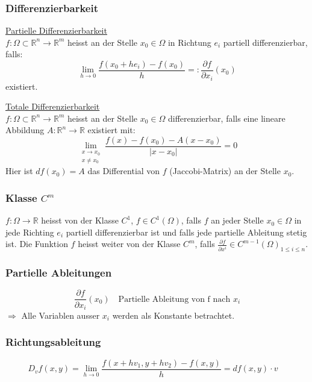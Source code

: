 \documentclass[6pt]{article}
\begin{document}
\begin{multicols*}{3}
	
	\subsubsection*{Differenzierbarkeit}
	
	\underline{Partielle Differenzierbarkeit} \\
	$f: \Omega \subset \mathbb{R}^n \to \mathbb{R}^m$ heisst an der Stelle $x_0 \in \Omega$ in Richtung $e_i$ partiell differenzierbar, falls:
	\[
			\lim_{h \to 0} \frac{f(x_0 + he_i)-f(x_0)}{h} =: \frac{\partial f}{\partial x_i} (x_0)
	\]
	existiert.
	\vspace{4mm}
		
	
	\underline{Totale Differenzierbarkeit} \\
	 $f: \Omega \subset \mathbb{R}^n \to \mathbb{R}^m$ heisst an der Stelle $x_0 \in \Omega$ differenzierbar, falls eine lineare Abbildung $A: \mathbb{R}^n \to \mathbb{R}$ existiert mit:
	\[ 
		\lim_{\substack{x \to x_0\\ x \neq x_0}} \frac{f(x)-f(x_0)-A(x-x_0)}{|x-x_0|} =0
	 \]
	Hier ist $df(x_0) = A$  das Differential von $f$ (Jaccobi-Matrix) an der Stelle $x_0$.
	
	\subsubsection*{Klasse $C^m$}
		$f:\Omega \to \mathbb{R}$ heisst von der Klasse $C^1$, $f \in C^1(\Omega)$, falls $f$ an jeder Stelle $x_0 \in \Omega$ in jede Richting $e_i$ partiell
	differenzierbar ist und falls jede partielle Ableitung stetig ist.
	Die Funktion $f$ heisst weiter von der Klasse $C^m$, falls $ \frac{\partial f}{\partial x^i} \in C^{m-1}(\Omega)_{1 \leq i \leq n} $.

	
	\subsubsection*{Partielle Ableitungen}
	
	\[
	   \frac{\partial f}{\partial x_i} (x_0) \quad \text{Partielle Ableitung von f nach $x_i$}
	 \]
	 $\Rightarrow $ Alle Variablen ausser $x_i$ werden als Konstante betrachtet.
	
	\subsubsection*{Richtungsableitung}
	\[
			D_vf(x,y) = \lim_{h \to 0} \frac{f(x+hv_1 , y+hv_2)-f(x,y)}{h} = df(x,y) \cdot v \quad 
	\]
	

\end{multicols*}
\end{document}
